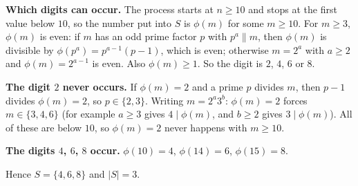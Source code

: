 \textbf{Which digits can occur.} The process starts at $n\ge10$ and stops at the first value below $10$, so the number put into $S$ is $\phi(m)$ for some $m\ge10$. For $m\ge3$, $\phi(m)$ is even: if $m$ has an odd prime factor $p$ with $p^a\parallel m$, then $\phi(m)$ is divisible by $\phi(p^a)=p^{a-1}(p-1)$, which is even; otherwise $m=2^a$ with $a\ge2$ and $\phi(m)=2^{a-1}$ is even. Also $\phi(m)\ge1$. So the digit is $2$, $4$, $6$ or $8$.

\textbf{The digit $2$ never occurs.} If $\phi(m)=2$ and a prime $p$ divides $m$, then $p-1$ divides $\phi(m)=2$, so $p\in\{2,3\}$. Writing $m=2^a3^b$: $\phi(m)=2$ forces $m\in\{3,4,6\}$ (for example $a\ge3$ gives $4\mid\phi(m)$, and $b\ge2$ gives $3\mid\phi(m)$). All of these are below $10$, so $\phi(m)=2$ never happens with $m\ge10$.

\textbf{The digits $4$, $6$, $8$ occur.} $\phi(10)=4$, $\phi(14)=6$, $\phi(15)=8$.

Hence $S=\{4,6,8\}$ and $|S|=\boxed{3}$.
